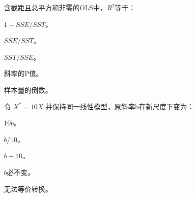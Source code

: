 \par\addvspace{6pt}\noindent\begin{minipage}{\linewidth}


含截距且总平方和非零的OLS中，\(R^2\)等于：


\begin{choices}

\item \(1-SSE/SST\)。

\item \(SSE/SST\)。

\item \(SST/SSE\)。

\item 斜率的P值。

\item 样本量的倒数。

\end{choices}

\end{minipage}\par\vspace{4pt}

\par\addvspace{6pt}\noindent\begin{minipage}{\linewidth}


令 \(X^*=10X\) 并保持同一线性模型，原斜率b在新尺度下变为：


\begin{choices}

\item \(10b\)。

\item \(b/10\)。

\item \(b+10\)。

\item \(b\)必不变。

\item 无法等价转换。

\end{choices}

\end{minipage}\par\vspace{4pt}

